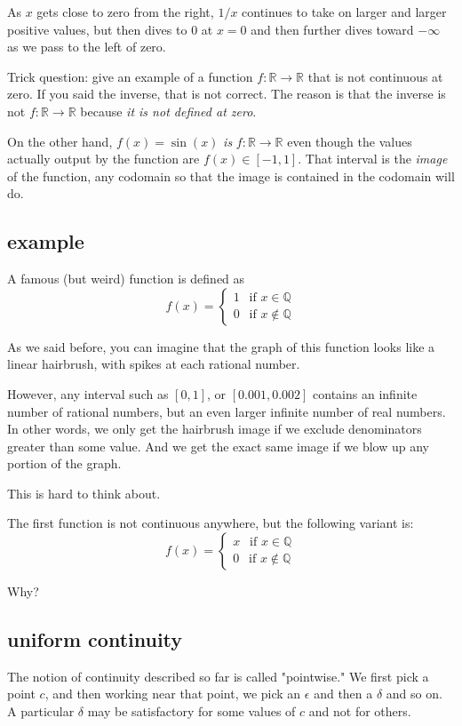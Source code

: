 \documentclass[11pt, oneside]{article}
\begin{document}
As $x$ gets close to zero from the right, $1/x$ continues to take on larger and larger positive values, but then dives to $0$ at $x=0$ and then further dives toward $-\infty$ as we pass to the left of zero.

Trick question:  give an example of a function $f : \mathbb{R} \rightarrow \mathbb{R}$ that is not continuous at zero.  If you said the inverse, that is not correct.  The reason is that the inverse is not $f : \mathbb{R} \rightarrow \mathbb{R}$ because \emph{it is not defined at zero}.

On the other hand, $f(x) = \sin(x)$ \emph{is} $f : \mathbb{R} \rightarrow \mathbb{R}$ even though the values actually output by the function are $f(x) \in [-1,1]$.  That interval is the \emph{image} of the function, any codomain so that the image is contained in the codomain will do.

\subsection*{example}
A famous (but weird) function is defined as
\[ f(x) =
\begin{cases}
1 \ \ \text{ if } x \in \mathbb{Q} \\
0 \ \ \text{ if } x \notin \mathbb{Q} 
\end{cases}
\]

As we said before, you can imagine that the graph of this function looks like a linear hairbrush, with spikes at each rational number.

However, any interval such as $[0,1]$, or $[0.001, 0.002]$ contains an infinite number of rational numbers, but an even larger infinite number of real numbers.  In other words, we only get the hairbrush image if we exclude denominators greater than some value.  And we get the exact same image if we blow up any portion of the graph.

This is hard to think about.

The first function is not continuous anywhere, but the following variant is:
\[ f(x) =
\begin{cases}
x \ \ \text{ if } x \in \mathbb{Q} \\
0 \ \ \text{ if } x \notin \mathbb{Q} 
\end{cases}
\]

Why?

\subsection*{uniform continuity}
The notion of continuity described so far is called "pointwise."  We first pick a point $c$, and then working near that point, we pick an $\epsilon$ and then a $\delta$ and so on.  A particular $\delta$ may be satisfactory for some values of $c$ and not for others.
\end{document}
